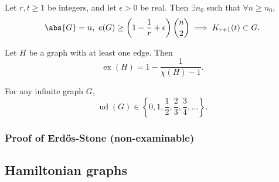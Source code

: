 \documentclass{article}
\DeclareMathOperator{\ext}{ex}
\DeclareMathOperator{\ud}{ud}
\begin{document}
\begin{nthm}\label{thm:14}
    Let $r, t \geq 1$ be integers, and let $\epsilon > 0$ be real.
    Then $\exists n_0$ such that $\forall n \geq n_0$,
    \begin{equation*}
        \abs{G} = n,\ e(G) \geq \left(1 - \frac{1}{r} + \epsilon\right) \binom{n}{2} \implies K_{r+1}(t) \subset G.
    \end{equation*}
\end{nthm}





\begin{ncor}\label{cor:15}
    Let $H$ be a graph with at least one edge. Then
    \begin{equation*}
        \ext(H) = 1 - \frac{1}{\chi(H) - 1}.
    \end{equation*}
\end{ncor}






















\begin{ncor}
    For any infinite graph $G$,
    \begin{equation*}
        \ud(G) \in \left\{0, 1, \frac{1}{2}, \frac{2}{3}, \frac{3}{4}, \dotsc\right\}.
    \end{equation*}
\end{ncor}

\subsubsection{Proof of Erd\H{o}s-Stone (non-examinable)}\label{sec:es}



















\subsection{Hamiltonian graphs}
\end{document}
